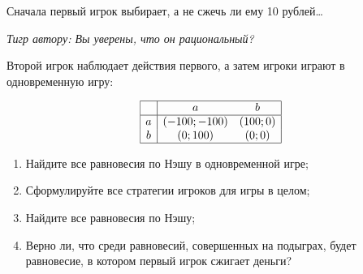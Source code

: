 \begin{problem}
Сначала первый игрок выбирает, а не сжечь ли ему 10 рублей\ldots \par
{\it Тигр  автору: Вы уверены, что он рациональный?} \par
Второй игрок наблюдает действия первого, а затем игроки играют в одновременную игру:\par
\[\begin{array}{|c|cc|}  \hline {} & {a} & {b} \\  \hline {a} & {\left(-100;-100\right)} & {\left(100;0\right)} \\ {b} & {\left(0;100\right)} & {\left(0;0\right)} \\  \hline  \end{array}\]
\begin{enumerate}
\item  Найдите все равновесия по Нэшу в одновременной игре;\par
\item Сформулируйте все стратегии игроков для игры в целом;\par
\item  Найдите все равновесия по Нэшу;\par
\item Верно ли, что среди равновесий, совершенных на подыграх, будет равновесие, в котором первый игрок сжигает деньги?
\end{enumerate}


\begin{sol}

\end{sol}
\end{problem}




